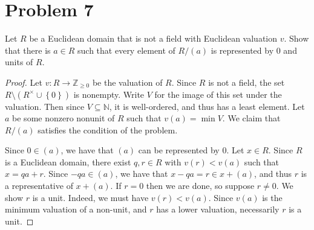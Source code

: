 \documentclass[11pt, letterpaper]{article}
\begin{document}
\section{Problem 7}

\begin{problem}
	Let $R$ be a Euclidean domain that is not a field with Euclidean valuation $v$. Show that there is $a\in R$ such that every element of $R/(a)$ is represented by $0$ and units of $R$.
\end{problem}
\begin{proof}
	Let $v : R \to \mathbb{Z}_{\geq 0}  $ be the valuation of $R$. Since $R$ is not a field, the set $R\setminus (R^\times \cup \left\{ 0 \right\} )$ is nonempty. Write $V$ for the image of this set under the valuation. Then since $V\subseteq \mathbb{N} $, it is well-ordered, and thus has a least element. Let $a$ be some nonzero nonunit of $R$ such that $v(a)=\min V$. We claim that $R/(a)$ satisfies the condition of the problem.

	Since $0\in (a)$, we have that $(a)$ can be represented by $0$. Let $x\in R$. Since $R$ is a Euclidean domain, there exist $q,r\in R$ with $v(r)<v(a)$ such that $x=qa+r$. Since $-qa\in (a)$, we have that $x-qa = r\in x+(a)$, and thus $r$ is a representative of $x+(a)$. If $r=0$ then we are done, so suppose $r\neq 0$. We show $r$ is a unit. Indeed, we must have $v(r)<v(a)$. Since $v(a)$ is the minimum valuation of a non-unit, and $r$ has a lower valuation, necessarily $r$ is a unit.
\end{proof}
\end{document}
